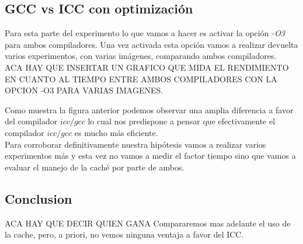 \subsection{GCC vs ICC con optimización }

Para esta parte del experimento lo que vamos a hacer es activar la opción \textit{-O3} para ambos compiladores. Una vez activada esta opción vamos a realizar devuelta varios experimentos, con varias imágenes, comparando ambos compiladores.\\


ACA HAY QUE INSERTAR UN GRAFICO QUE MIDA EL RENDIMIENTO EN CUANTO AL TIEMPO ENTRE AMBOS COMPILADORES CON LA OPCION -O3 PARA VARIAS IMAGENES.

Como muestra la figura anterior podemos observar una amplia diferencia a favor del compilador $icc/ gcc$ lo cual nos predispone a pensar que efectivamente el compilador $icc/ gcc$ es mucho más eficiente.\\
Para corroborar definitivamente nuestra hipótesis vamos a realizar varios experimentos más y esta vez no vamos a medir el factor tiempo sino que vamos a evaluar el manejo de la caché por parte de ambos.



\subsection{Conclusion}
ACA HAY QUE DECIR QUIEN GANA
Compararemos mas adelante el uso de la cache, pero, a priori, no vemos ninguna ventaja a favor del ICC.
